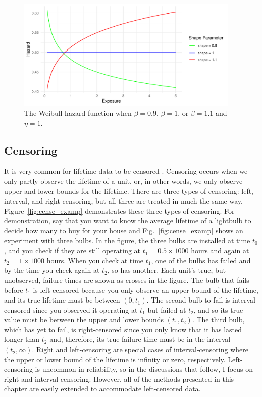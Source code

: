 \begin{figure}[tbp]
    \centering
    \includegraphics[width=0.95\textwidth]{./figures/ch-2/hazard_func_demo.pdf}
    \caption{The Weibull hazard function when $\beta = 0.9$, $\beta = 1$, or $\beta = 1.1$ and $\eta = 1$.}
    \label{fig:hazard_function_demo}
\end{figure}

\subsection{Censoring} \label{subsec:censoring-treatments}

It is very common for lifetime data to be censored \citep{tian2024}. Censoring occurs when we only partly observe the lifetime of a unit, or, in other words, we only observe upper and lower bounds for the lifetime. There are three types of censoring: left, interval, and right-censoring, but all three are treated in much the same way. Figure~\ref{fig:cense_examp} demonstrates these three types of censoring. For demonstration, say that you want to know the average lifetime of a lightbulb to decide how many to buy for your house and Fig.~\ref{fig:cense_examp} shows an experiment with three bulbs. In the figure, the three bulbs are installed at time $t_0$, and you check if they are still operating at $t_1 = 0.5 \times 1000$ hours and again at $t_2 = 1 \times 1000$ hours. When you check at time $t_1$, one of the bulbs has failed and by the time you check again at $t_2$, so has another. Each unit's true, but unobserved, failure times are shown as crosses in the figure. The bulb that fails before $t_1$ is left-censored because you only observe an upper bound of the lifetime, and its true lifetime must be between $(0, t_1)$. The second bulb to fail is interval-censored since you observed it operating at $t_1$ but failed at $t_2$, and so its true value must be between the upper and lower bounds $(t_1, t_2)$. The third bulb, which has yet to fail, is right-censored since you only know that it has lasted longer than $t_2$ and, therefore, its true failure time must be in the interval $(t_2, \infty)$. Right and left-censoring are special cases of interval-censoring where the upper or lower bound of the lifetime is infinity or zero, respectively. Left-censoring is uncommon in reliability, so in the discussions that follow, I focus on right and interval-censoring. However, all of the methods presented in this chapter are easily extended to accommodate left-censored data.

